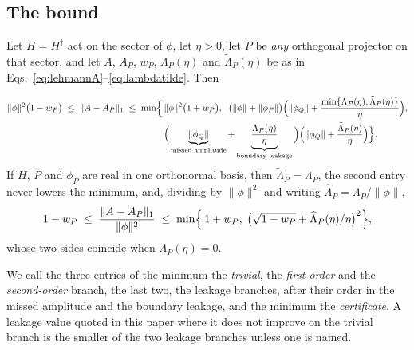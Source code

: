\subsection{The bound}

%
%
%
%
%
\begin{theorem}
\label{thm:leakage}
Let $H=H^{\dagger}$ act on the sector of $\phi$, let $\eta>0$, let $P$ be \emph{any} orthogonal
projector on that sector, and let $A$, $A_P$, $w_P$, $\Lambda_P(\eta)$ and $\tilde\Lambda_P(\eta)$ be as in
Eqs.~\eqref{eq:lehmannA}--\eqref{eq:lambdatilde}. Then
\begin{widetext}
\begin{equation}
\begin{aligned}
\lVert\phi\rVert^{2}\bigl(1-w_P\bigr)
\;\le\;\lVert A-A_P\rVert_{1}\;\le\;
\min\Bigl\{\,&\lVert\phi\rVert^{2}\bigl(1+w_P\bigr),\;\;
\bigl(\lVert\phi\rVert+\lVert\phi_P\rVert\bigr)
\Bigl(\lVert\phi_Q\rVert+\frac{\min\{\Lambda_P(\eta),\tilde\Lambda_P(\eta)\}}{\eta}\Bigr),\\
&\Bigl(\,\underbrace{\lVert\phi_Q\rVert}_{\text{missed amplitude}}
+\underbrace{\frac{\Lambda_P(\eta)}{\eta}}_{\text{boundary leakage}}\,\Bigr)
\Bigl(\lVert\phi_Q\rVert+\frac{\tilde\Lambda_P(\eta)}{\eta}\Bigr)\Bigr\}.
\end{aligned}
\label{eq:twobudget}
\end{equation}
\noindent If $H$, $P$ and $\phi_P$ are real in one orthonormal basis, then $\tilde\Lambda_P=\Lambda_P$, the
second entry never lowers the minimum, and, dividing by $\lVert\phi\rVert^{2}$ and writing
$\widehat\Lambda_P=\Lambda_P/\lVert\phi\rVert$,
\begin{equation*}
1-w_P\;\le\;\frac{\lVert A-A_P\rVert_{1}}{\lVert\phi\rVert^{2}}\;\le\;
\min\Bigl\{\,1+w_P,\;\bigl(\sqrt{1-w_P}+\widehat\Lambda_P(\eta)/\eta\bigr)^{2}\Bigr\},
\end{equation*}
whose two sides coincide when $\Lambda_P(\eta)=0$.
\end{widetext}
\end{theorem}


%
%
\noindent We call the three entries of the minimum the \emph{trivial}, the \emph{first-order} and the
\emph{second-order} branch, the last two, the leakage branches, after their order in the missed amplitude and the
boundary leakage, and the minimum the \emph{certificate}. A leakage value quoted in this paper where it does not
improve on the trivial branch is the smaller of the two leakage branches unless one is named.

